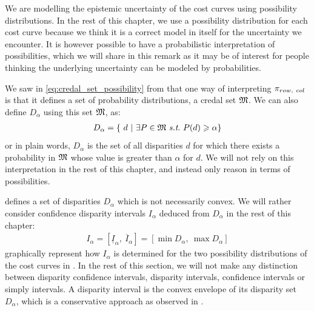 \begin{remark}
    We are modelling the epistemic uncertainty of the cost curves using possibility distributions. In the rest of this chapter, we use a possibility distribution for each cost curve because we think it is a correct model in itself for the uncertainty we encounter. It is however possible to have a probabilistic interpretation of possibilities, which we will share in this remark as it may be of interest for people thinking the underlying uncertainty can be modeled by probabilities.
    
    We saw in \cref{eq:credal_set_possibility} from  that one way of interpreting $\pi_{row, ~col}$ is that it defines a set of probability distributions, \ie a credal set $\mathfrak{M}$. We can also define $D_\alpha$ using this set $\mathfrak{M}$, as:
    \begin{align}
        D_\alpha=\{~ d ~|~ \exists P\in\M ~\st~ P(d)\geqslant \alpha\}
    \end{align}
    or in plain words, $D_\alpha$ is the set of all disparities $d$ for which there exists a probability in $\mathfrak{M}$ whose value is greater than $\alpha$ for $d$. We will not rely on this interpretation in the rest of this chapter, and instead only reason in terms of possibilities.
\end{remark}


 defines a set of disparities $D_\alpha$ which is not necessarily convex. We will rather consider confidence disparity intervals $I_\alpha$ deduced from $D_\alpha$ in the rest of this chapter:
\begin{align}
    I_\alpha = [\underline{I}_\alpha,~\overline{I}_\alpha]=[\min D_\alpha, ~\max D_\alpha]\label{eq:confidence_disparity_intervals}
\end{align}
 graphically represent how $I_\alpha$ is determined for the two possibility distributions of the cost curves in . In the rest of this section, we will not make any distinction between disparity confidence intervals, disparity intervals, confidence intervals or simply intervals. A disparity interval is the convex envelope of its disparity set $D_\alpha$, which is a conservative approach as observed in .

